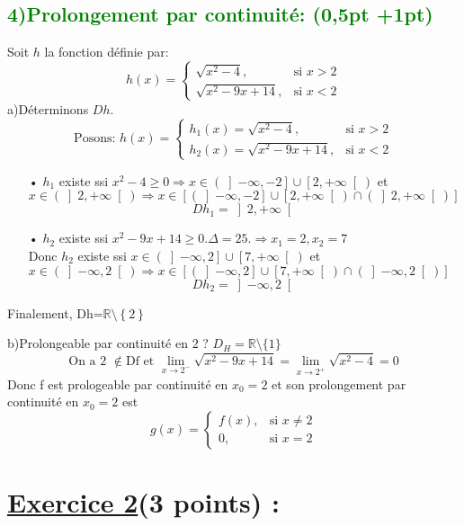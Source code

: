 \documentclass{article}
\begin{document}
\subsection*{ \textcolor{green}{4)Prolongement par continuité: (0,5pt +1pt)}}
Soit $h$ la fonction définie par:
\[ h(x) = \begin{cases} 
  \sqrt{x^{2}-4}, & \text{si } x > 2 \\
  \sqrt{x^{2}-9x+14}, & \text{si } x < 2
\end{cases} \]
a)Déterminons $Dh$.\\
\[\text{Posons: } h(x) = \begin{cases} 
  h_{1}(x)=\sqrt{x^{2}-4}, & \text{si } x > 2 \\
  h_{2}(x)=\sqrt{x^{2}-9x+14}, & \text{si } x < 2
\end{cases} \]
\begin{itemize}
\item[•]$h_{1}$ existe ssi $x^{2}-4\geq0 \Rightarrow x\in \left( \left]-\infty, -2\right] \cup \left[2, +\infty\right[ \right) $ et $x \in\left( \left]2, +\infty\right[\right) \Rightarrow x\in \left[ \left( \left]-\infty, -2\right] \cup \left[2, +\infty\right[ \right)\cap\left( \left]2, +\infty\right[\right) \right] $
\[Dh_{1}=\left]2, +\infty\right[ \]
\item[•]$h_{2}$ existe ssi $x^{2}-9x+14 \geq 0. \Delta = 25. \Rightarrow x_{1}=2, x_{2}=7$\\
Donc $h_{2}$ existe ssi $x\in \left( \left]-\infty, 2\right] \cup \left[7, +\infty\right[ \right) $ et $x \in\left( \left]-\infty, 2\right[\right) \Rightarrow x\in \left[ \left( \left]-\infty, 2\right] \cup \left[7, +\infty\right[ \right)\cap\left( \left]-\infty, 2\right[\right) \right]$
\[Dh_{2}=\left]-\infty, 2\right[ \] 
\end{itemize}
Finalement, Dh=$\mathbb{R}\setminus\left\lbrace 2 \right\rbrace $

b)Prolongeable par continuité en $2$ ?
$D_{H}=\mathbb{R}\setminus\{1\}$\\
\[\text{On a 2 }\notin \text{Df et } \lim_{x \to 2^{-}}\sqrt{x^{2}-9x+14}=\lim_{x \to 2^{+}}\sqrt{x^{2}-4}=0\]
Donc f est prologeable par continuité en $x_{0}=2$ et son prolongement par continuité en $x_{0}=2$ est 
\[ g(x) = \begin{cases} 
  f(x), & \text{si } x \neq 2 \\
  0, & \text{si } x= 2
\end{cases} \]
\section*{\underline{Exercice 2}(3 points) :}
\end{document}
